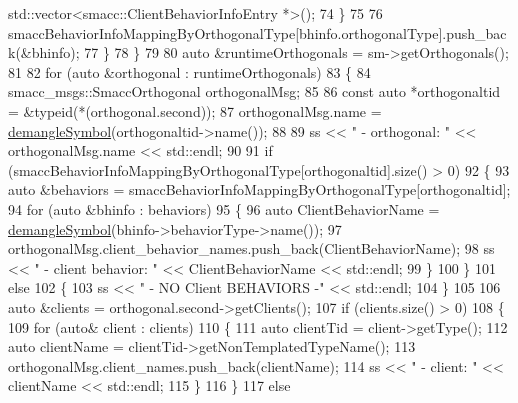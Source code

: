 \begin{DoxyCode}
      std::vector<smacc::ClientBehaviorInfoEntry *>();
74                 \}
75 
76                 smaccBehaviorInfoMappingByOrthogonalType[bhinfo.orthogonalType].push\_back(&bhinfo);
77             \}
78         \}
79 
80         \textcolor{keyword}{auto} &runtimeOrthogonals = sm->getOrthogonals();
81 
82         \textcolor{keywordflow}{for} (\textcolor{keyword}{auto} &orthogonal : runtimeOrthogonals)
83         \{
84             smacc\_msgs::SmaccOrthogonal orthogonalMsg;
85 
86             \textcolor{keyword}{const} \textcolor{keyword}{auto} *orthogonaltid = &\textcolor{keyword}{typeid}(*(orthogonal.second));
87             orthogonalMsg.name = \hyperlink{namespacesmacc_1_1introspection_a2f495108db3e57604d8d3ff5ef030302}{demangleSymbol}(orthogonaltid->name());
88 
89             ss << \textcolor{stringliteral}{" - orthogonal: "} << orthogonalMsg.name << std::endl;
90 
91             \textcolor{keywordflow}{if} (smaccBehaviorInfoMappingByOrthogonalType[orthogonaltid].size() > 0)
92             \{
93                 \textcolor{keyword}{auto} &behaviors = smaccBehaviorInfoMappingByOrthogonalType[orthogonaltid];
94                 \textcolor{keywordflow}{for} (\textcolor{keyword}{auto} &bhinfo : behaviors)
95                 \{
96                     \textcolor{keyword}{auto} ClientBehaviorName = \hyperlink{namespacesmacc_1_1introspection_a2f495108db3e57604d8d3ff5ef030302}{demangleSymbol}(bhinfo->behaviorType->name());
97                     orthogonalMsg.client\_behavior\_names.push\_back(ClientBehaviorName);
98                     ss << \textcolor{stringliteral}{"          - client behavior: "} << ClientBehaviorName << std::endl;
99                 \}
100             \}
101             \textcolor{keywordflow}{else}
102             \{
103                 ss << \textcolor{stringliteral}{"          - NO Client BEHAVIORS -"} << std::endl;
104             \}
105 
106             \textcolor{keyword}{auto} &clients = orthogonal.second->getClients();
107             \textcolor{keywordflow}{if} (clients.size() > 0)
108             \{
109                 \textcolor{keywordflow}{for} (\textcolor{keyword}{auto}& client : clients)
110                 \{
111                     \textcolor{keyword}{auto} clientTid = client->getType();
112                     \textcolor{keyword}{auto} clientName = clientTid->getNonTemplatedTypeName();
113                     orthogonalMsg.client\_names.push\_back(clientName);
114                     ss << \textcolor{stringliteral}{"          - client: "} << clientName << std::endl;
115                 \}
116             \}
117             \textcolor{keywordflow}{else}

\end{DoxyCode}
